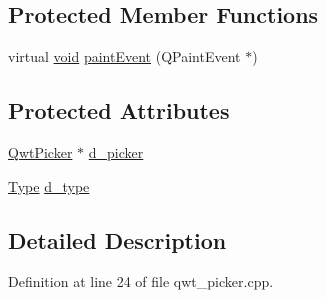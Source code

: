 \subsection*{Protected Member Functions}
\begin{DoxyCompactItemize}
\item 
virtual \hyperlink{group___u_a_v_objects_plugin_ga444cf2ff3f0ecbe028adce838d373f5c}{void} \hyperlink{class_qwt_picker_1_1_picker_widget_abea6e6a9f0b98488ada57edf3b525070}{paint\-Event} (Q\-Paint\-Event $\ast$)
\end{DoxyCompactItemize}
\subsection*{Protected Attributes}
\begin{DoxyCompactItemize}
\item 
\hyperlink{class_qwt_picker}{Qwt\-Picker} $\ast$ \hyperlink{class_qwt_picker_1_1_picker_widget_afcedc61ae3f82f6915bc033e6e1e1868}{d\-\_\-picker}
\item 
\hyperlink{class_qwt_picker_1_1_picker_widget_a874ed63e86ce1a6a7a80cceca11fcfd9}{Type} \hyperlink{class_qwt_picker_1_1_picker_widget_adda5f381a70797346478dcdebcd64009}{d\-\_\-type}
\end{DoxyCompactItemize}


\subsection{Detailed Description}


Definition at line 24 of file qwt\-\_\-picker.\-cpp.



